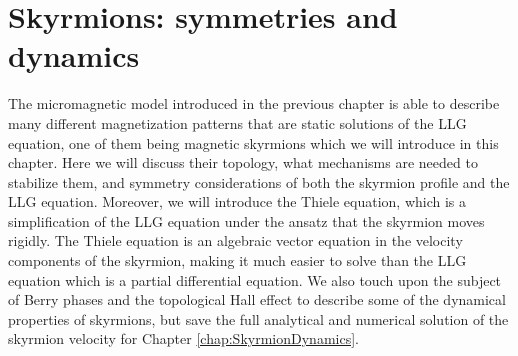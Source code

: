 \chapter{Skyrmions: symmetries and dynamics} \label{chap:Skyrmions}
The micromagnetic model introduced in the previous chapter is able to describe many different magnetization patterns that are static solutions of the LLG equation, one of them being magnetic skyrmions which we will introduce in this chapter. Here we will discuss their topology, what mechanisms are needed to stabilize them, and symmetry considerations of both the skyrmion profile and the LLG equation. Moreover, we will introduce the Thiele equation, which is a simplification of the LLG equation under the ansatz that the skyrmion moves rigidly. The Thiele equation is an algebraic vector equation in the velocity components of the skyrmion, making it much easier to solve than the LLG equation which is a partial differential equation. We also touch upon the subject of Berry phases and the topological Hall effect to describe some of the dynamical properties of skyrmions, but save the full analytical and numerical solution of the skyrmion velocity for Chapter \ref{chap:SkyrmionDynamics}.

